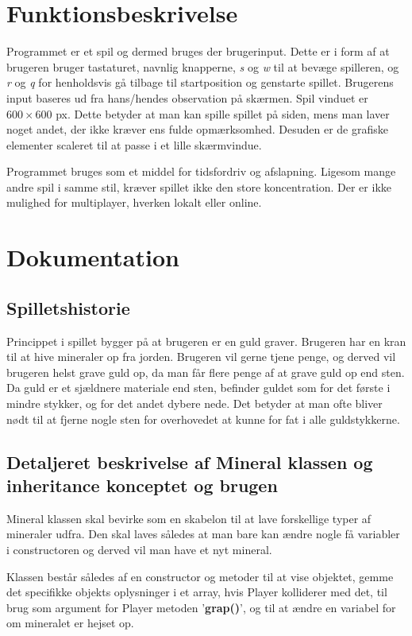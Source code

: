 \documentclass[12pt,a4paper]{article}
\begin{document}
\section{Funktionsbeskrivelse}
    Programmet er et spil og dermed bruges der brugerinput. Dette er i form af at brugeren bruger tastaturet, navnlig knapperne, \emph{s} og \emph{w} til at bevæge spilleren, og \emph{r} og \emph{q} for henholdsvis gå tilbage til startposition og genstarte spillet. Brugerens input baseres ud fra hans/hendes observation på skærmen. Spil vinduet er $600 \times 600$ px. Dette betyder at man kan spille spillet på siden, mens man laver noget andet, der ikke kræver ens fulde opmærksomhed. Desuden er de grafiske elementer scaleret til at passe i et lille skærmvindue.

    Programmet bruges som et middel for tidsfordriv og afslapning. Ligesom mange andre spil i samme stil, kræver spillet ikke den store koncentration. Der er ikke mulighed for multiplayer, hverken lokalt eller online.

\section{Dokumentation}
    \subsection{Spilletshistorie}
        Princippet i spillet bygger på at brugeren er en guld graver. Brugeren har en kran til at hive mineraler op fra jorden. Brugeren vil gerne tjene penge, og derved vil brugeren helst grave guld op, da man får flere penge af at grave guld op end sten. Da guld er et sjældnere materiale end sten, befinder guldet som for det første i mindre stykker, og for det andet dybere nede. Det betyder at man ofte bliver nødt til at fjerne nogle sten for overhovedet at kunne for fat i alle guldstykkerne.

    \subsection{Detaljeret beskrivelse af Mineral klassen og inheritance konceptet og brugen}
        Mineral klassen skal bevirke som en skabelon til at lave forskellige typer af mineraler udfra. Den skal laves således at man bare kan ændre nogle få variabler i constructoren og derved vil man have et nyt mineral.

        Klassen består således af en constructor og metoder til at vise objektet, gemme det specifikke objekts oplysninger i et array, hvis Player kolliderer med det, til brug som argument for Player metoden '\textbf{grap()}', og til at ændre en variabel for om mineralet er hejset op.
\end{document}
